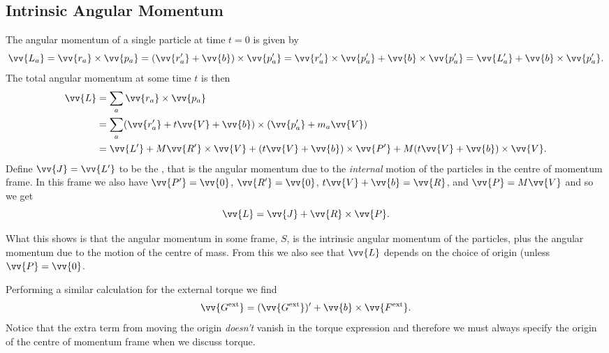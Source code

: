 \documentclass[fleqn]{NotesClass}
\newcommand*{\ext}{\mathrm{ext}}
\begin{document}
    \subsection{Intrinsic Angular Momentum}
    The angular momentum of a single particle at time \(t = 0\) is given by
    \begin{equation}
        \vv{L_a} = \vv{r_a} \times \vv{p_a} = (\vv{r_a'} + \vv{b})\times \vv{p_a'} = \vv{r_a'}\times\vv{p_a'} + \vv{b}\times\vv{p_a'} = \vv{L_a'} + \vv{b}\times\vv{p_a'}.
    \end{equation}
    The total angular momentum at some time \(t\) is then
    \begin{align}
        \vv{L} &= \sum_a \vv{r_a} \times \vv{p_a}\\
        &= \sum_a (\vv{r'_a} + t\vv{V} + \vv{b})\times (\vv{p_a'} + m_a\vv{V})\\
        &= \vv{L'} + M\vv{R'} \times \vv{V} + (t\vv{V} + \vv{b}) \times \vv{P'} + M(t\vv{V} + \vv{b})\times\vv{V}.
    \end{align}
    Define \(\vv{J} = \vv{L'}\) to be the , that is the angular momentum due to the \emph{internal} motion of the particles in the centre of momentum frame.
    In this frame we also have \(\vv{P'} = \vv{0}\), \(\vv{R'} = \vv{0}\), \(t\vv{V} + \vv{b} = \vv{R}\), and \(\vv{P} = M\vv{V}\) and so we get
    \begin{equation}
        \vv{L} = \vv{J} + \vv{R} \times \vv{P}.
    \end{equation}
    
    What this shows is that the angular momentum in some frame, \(S\), is the intrinsic angular momentum of the particles, plus the angular momentum due to the motion of the centre of mass.
    From this we also see that \(\vv{L}\) depends on the choice of origin (unless \(\vv{P} = \vv{0}\).
    
    Performing a similar calculation for the external torque we find
    \begin{equation}
        \vv{G^{\ext}} = (\vv{G^{\ext}})' + \vv{b}\times\vv{F^{\ext}}.
    \end{equation}
    Notice that the extra term from moving the origin \emph{doesn't} vanish in the torque expression and therefore we must always specify the origin of the centre of momentum frame when we discuss torque.
    
\end{document}
